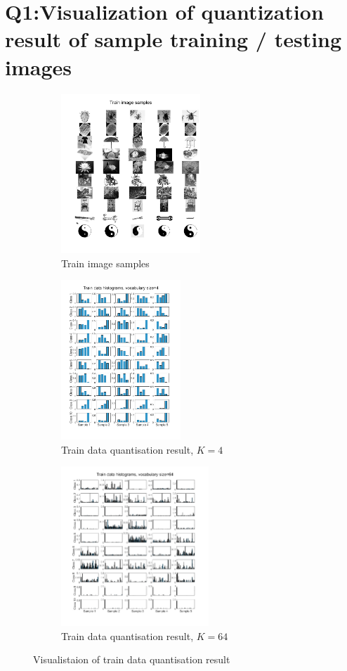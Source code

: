 \section{Q1:Visualization of quantization result of sample training / testing images}
\label{subsec:Q1_histograms}

\begin{figure}[htbp]
	\centering
	\begin{subfigure}[t]{0.3\linewidth}
		\centering
		\includegraphics[height=6cm]{image/q1-appendix/train_img.png} 
		\caption{Train image samples}
	\end{subfigure}%
	\hfill
	\begin{subfigure}[t]{0.3\linewidth}
		\centering
		\includegraphics[height=6cm]{image/q1-appendix/train_4.png}
		\caption{Train data quantisation result, $K=4$}
	\end{subfigure}
	\hfill
	\begin{subfigure}[t]{0.3\linewidth}
		\centering
		\includegraphics[height=6cm]{image/q1-appendix/train_64.png}
		\caption{Train data quantisation result, $K=64$}
	\end{subfigure}
	\caption{Visualistaion of train data quantisation result}
	\label{fig:q1_histogram_tr}
\end{figure}

